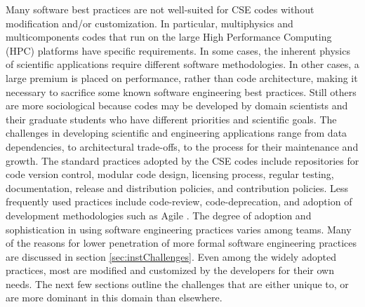 Many software best practices are not well-suited for CSE codes without
modification and/or customization.  In particular, multiphysics and
multicomponents codes that run on the large High Performance Computing
(HPC) platforms have specific requirements.  In some cases, the
inherent physics of scientific applications require different software
methodologies.  In other cases, a large premium is placed on
performance, rather than code architecture, making it necessary to
sacrifice some known software engineering best practices.  Still
others are more sociological because codes may be developed by domain
scientists and their graduate students who have different priorities
and scientific goals.  
The challenges in developing scientific and engineering applications range
from data dependencies, to architectural trade-offs, to the process for their maintenance and
growth. 
The standard practices adopted by the CSE codes include
repositories for code version control, modular code design, licensing
process, regular testing, documentation, release and distribution
policies, and contribution policies. Less frequently used practices
include code-review, code-deprecation, and adoption of development
methodologies such as Agile \cite{agile}. 
The degree of adoption and
sophistication in using software engineering practices varies among teams. Many of
the reasons for lower penetration of more formal software engineering practices are discussed in section
\ref{sec:instChallenges}. Even among the widely adopted
practices, most are modified and customized by the developers for
their own needs. The next few sections outline the challenges that
are either unique to, or are more dominant in this domain than
elsewhere.  


